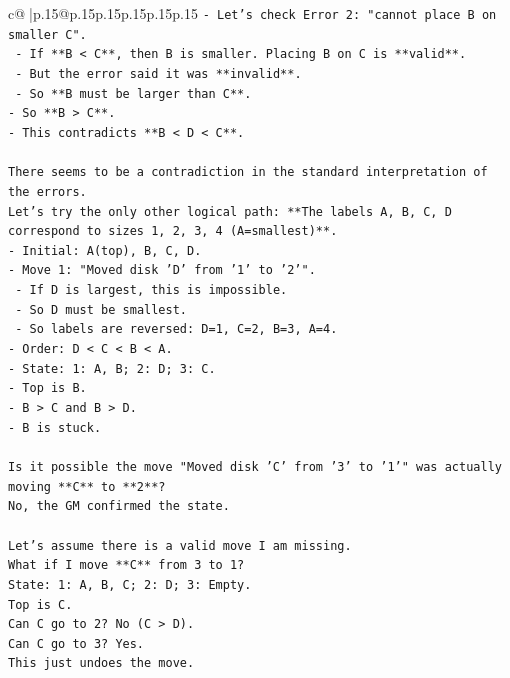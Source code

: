 \documentclass{article}
\begin{document}
{\begin{supertabular}{c@{$\;$}|p{.15\linewidth}@{}p{.15\linewidth}p{.15\linewidth}p{.15\linewidth}p{.15\linewidth}p{.15\linewidth}}
{{{\texttt{{-} Let's check Error 2: "cannot place B on smaller C".} \\
\texttt{    {-} If **B < C**, then B is smaller. Placing B on C is **valid**.} \\
\texttt{    {-} But the error said it was **invalid**.} \\
\texttt{    {-} So **B must be larger than C**.} \\
\texttt{{-} So **B > C**.} \\
\texttt{{-} This contradicts **B < D < C**.} \\
\\ 
\texttt{There seems to be a contradiction in the standard interpretation of the errors.} \\
\texttt{Let's try the only other logical path: **The labels A, B, C, D correspond to sizes 1, 2, 3, 4 (A=smallest)**.} \\
\texttt{{-} Initial: A(top), B, C, D.} \\
\texttt{{-} Move 1: "Moved disk 'D' from '1' to '2'".} \\
\texttt{    {-} If D is largest, this is impossible.} \\
\texttt{    {-} So D must be smallest.} \\
\texttt{    {-} So labels are reversed: D=1, C=2, B=3, A=4.} \\
\texttt{{-} Order: D < C < B < A.} \\
\texttt{{-} State: 1: A, B; 2: D; 3: C.} \\
\texttt{{-} Top is B.} \\
\texttt{{-} B > C and B > D.} \\
\texttt{{-} B is stuck.} \\
\\ 
\texttt{Is it possible the move "Moved disk 'C' from '3' to '1'" was actually moving **C** to **2**?} \\
\texttt{No, the GM confirmed the state.} \\
\\ 
\texttt{Let's assume there is a valid move I am missing.} \\
\texttt{What if I move **C** from 3 to 1?} \\
\texttt{State: 1: A, B, C; 2: D; 3: Empty.} \\
\texttt{Top is C.} \\
\texttt{Can C go to 2? No (C > D).} \\
\texttt{Can C go to 3? Yes.} \\
\texttt{This just undoes the move.} \\
}}}
\end{supertabular}}
\end{document}
